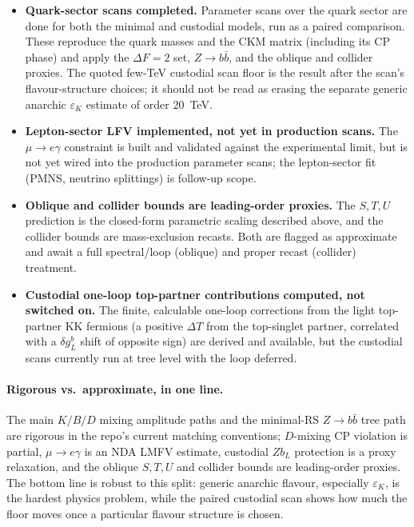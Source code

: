 \documentclass[11pt]{article}
\newcommand{\epsK}{\varepsilon_K}
\begin{document}
\begin{itemize}[leftmargin=1.4em]
\item \textbf{Quark-sector scans completed.} Parameter scans over the quark
sector are done for both the minimal and custodial models, run as a paired
comparison. These reproduce the quark masses and the CKM matrix (including its
CP phase) and apply the $\Delta F=2$ set, $Z\to b\bar b$, and the oblique and
collider proxies. The quoted few-TeV custodial scan floor is the result after the
scan's flavour-structure choices; it should not be read as erasing the separate
generic anarchic $\epsK$ estimate of order $20$~TeV.
\item \textbf{Lepton-sector LFV implemented, not yet in production scans.} The
$\mu\to e\gamma$ constraint is built and validated against the experimental
limit, but is not yet wired into the production parameter scans; the lepton-sector
fit (PMNS, neutrino splittings) is follow-up scope.
\item \textbf{Oblique and collider bounds are leading-order proxies.} The
$S,T,U$ prediction is the closed-form parametric scaling described above, and the
collider bounds are mass-exclusion recasts. Both are flagged as approximate and
await a full spectral/loop (oblique) and proper recast (collider) treatment.
\item \textbf{Custodial one-loop top-partner contributions computed, not switched
on.} The finite, calculable one-loop corrections from the light top-partner KK
fermions (a positive $\Delta T$ from the top-singlet partner, correlated with a
$\delta g_L^b$ shift of opposite sign) are derived and available, but the
custodial scans currently run at tree level with the loop deferred.
\end{itemize}

\paragraph{Rigorous vs.\ approximate, in one line.} The main $K/B/D$ mixing
amplitude paths and the minimal-RS $Z\to b\bar b$ tree path are rigorous in the
repo's current matching conventions; $D$-mixing CP violation is partial,
$\mu\to e\gamma$ is an NDA LMFV estimate, custodial $Zb_L$ protection is a proxy
relaxation, and the oblique $S,T,U$ and collider bounds are leading-order
proxies. The bottom line is robust to this split: generic anarchic flavour,
especially $\epsK$, is the hardest physics problem, while the paired custodial
scan shows how much the floor moves once a particular flavour structure is
chosen.
\end{document}
